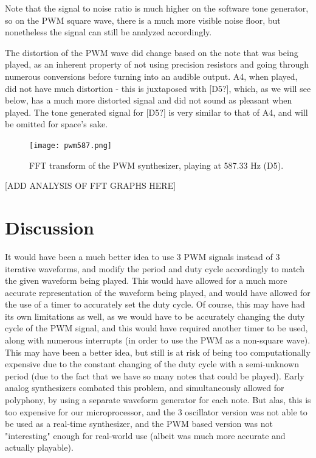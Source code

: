 \documentclass[12pt]{article}
\begin{document}
Note that the signal to noise ratio is much higher on the software tone generator, so on the PWM square wave, there is a much more visible noise floor, but nonetheless the signal can still be analyzed accordingly. 

The distortion of the PWM wave did change based on the note that was being played, as an inherent property of not using precision resistors and going through numerous conversions before turning into an audible output. A4, when played, did not have much distortion - this is juxtaposed with [D5?], which, as we will see below, has a much more distorted signal and did not sound as pleasant when played. The tone generated signal for [D5?] is very similar to that of A4, and will be omitted for space's sake. 

\begin{figure}[H]
    \centering
    \texttt{[image: pwm587.png]}
    \caption{FFT transform of the PWM synthesizer, playing at 587.33 Hz (D5). }
    \label{fig:pwm587}
\end{figure}

[ADD ANALYSIS OF FFT GRAPHS HERE]


\section{Discussion}\label{sec:discussion}


It would have been a much better idea to use 3 PWM signals instead of 3 iterative waveforms, and modify the period and duty cycle accordingly to match the given waveform being played.
This would have allowed for a much more accurate representation of the waveform being played, and would have allowed for the use of a timer to accurately set the duty cycle.
Of course, this may have had its own limitations as well, as we would have to be accurately changing the duty cycle of the PWM signal, and this would have required another timer to be used, along with numerous interrupts (in order to use the PWM as a non-square wave).
This may have been a better idea, but still is at risk of being too computationally expensive due to the constant changing of the duty cycle with a semi-unknown period (due to the fact that we have so many notes that could be played). 
Early analog synthesizers combated this problem, and simultaneously allowed for polyphony, by using a separate waveform generator for each note.
But alas, this is too expensive for our microprocessor, and the 3 oscillator version was not able to be used as a real-time synthesizer, and the PWM based version was not "interesting" enough for real-world use (albeit was much more accurate and actually playable).
\end{document}
